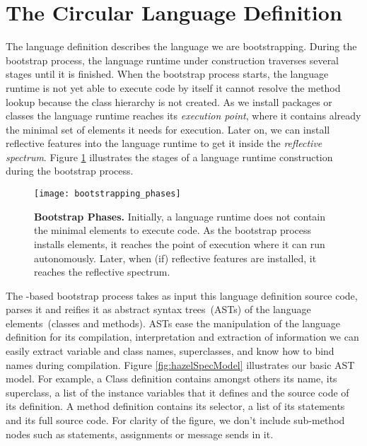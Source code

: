 %

\section{The Circular Language Definition}\label{sec:circular_definition}

The language definition describes the language we are bootstrapping. During the bootstrap process, the language runtime under construction traverses several stages until it is finished. When the bootstrap process starts, the language runtime is not yet able to execute code by itself \eg it cannot resolve the method lookup because the class hierarchy is not created. As we install packages or classes the language runtime reaches its \emph{execution point}, where it contains already the minimal set of elements it needs for execution. Later on, we can install reflective features into the language runtime to get it inside the \emph{reflective spectrum}. Figure \ref{fig:phases} illustrates the stages of a language runtime construction during the bootstrap process.

\begin{figure}[ht]
\center
\texttt{[image: bootstrapping\_phases]}
\caption{\textbf{Bootstrap Phases.} Initially, a language runtime does not contain the minimal elements to execute code. As the bootstrap process installs elements, it reaches the point of execution where it can run autonomously. Later, when (if) reflective features are installed, it reaches the reflective spectrum.\label{fig:phases}}
\end{figure}

The \Vtt-based bootstrap process takes as input this language definition source code, parses it and reifies it as abstract syntax trees~(ASTs) of the language elements~(\eg classes and methods).
ASTs ease the manipulation of the language definition for its compilation, interpretation and extraction of information \eg we can easily extract variable and class names, superclasses, and know how to bind names during compilation. Figure \ref{fig:hazelSpecModel} illustrates our basic AST model. For example, a Class definition contains amongst others its name, its superclass, a list of the instance variables that it defines and the source code of its definition. A method definition contains its selector, a list of its statements and its full source code. For clarity of the figure, we don't include sub-method nodes such as statements, assignments or message sends in it.

